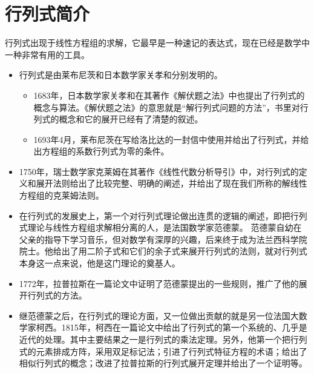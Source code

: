 \section{行列式简介}

\begin{frame}

  行列式出现于线性方程组的求解，它最早是一种速记的表达式，现在已经是数学中一种非常有用的工具。\\

  \pause
  \begin{itemize}
  \item 行列式是由莱布尼茨和日本数学家关孝和分别发明的。 \\ 
    \begin{itemize}
    \item 1683年，日本数学家关孝和在其著作《解伏题之法》中也提出了行列式的概念与算法。《解伏题之法》的意思就是“解行列式问题的方法”，书里对行列式的概念和它的展开已经有了清楚的叙述。\\[0.1in]
    \item 1693年4月，莱布尼茨在写给洛比达的一封信中使用并给出了行列式，并给出方程组的系数行列式为零的条件。

    \end{itemize}
    \pause 
  \item
    1750年，瑞士数学家克莱姆在其著作《线性代数分析导引》中，对行列式的定义和展开法则给出了比较完整、明确的阐述，并给出了现在我们所称的解线性方程组的克莱姆法则。
  \end{itemize}
    
\end{frame}

\begin{frame}
  \begin{itemize}

  \item
    在行列式的发展史上，第一个对行列式理论做出连贯的逻辑的阐述，即把行列式理论与线性方程组求解相分离的人，是法国数学家范德蒙。
    范德蒙自幼在父亲的指导下学习音乐，但对数学有深厚的兴趣，后来终于成为法兰西科学院院士。他给出了用二阶子式和它们的余子式来展开行列式的法则，就对行列式本身这一点来说，他是这门理论的奠基人。
    \\[0.1in] \pause
  \item
    1772年，拉普拉斯在一篇论文中证明了范德蒙提出的一些规则，推广了他的展开行列式的方法。\\[0.1in]
    \pause
  \item
    继范德蒙之后，在行列式的理论方面，又一位做出贡献的就是另一位法国大数学家柯西。1815年，柯西在一篇论文中给出了行列式的第一个系统的、几乎是近代的处理。其中主要结果之一是行列式的乘法定理。另外，他第一个把行列式的元素排成方阵，采用双足标记法；引进了行列式特征方程的术语；给出了相似行列式的概念；改进了拉普拉斯的行列式展开定理并给出了一个证明等。
  \end{itemize}

  
\end{frame}

